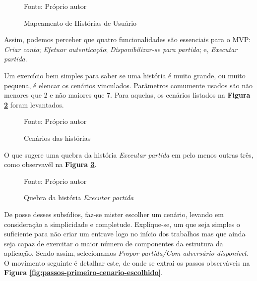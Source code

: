       \begin{figure}[h]
        \centering
        \caption{Mapeamento de Histórias de Usuário}
        Fonte: Próprio autor\footnotemark
        \label{fig:fluxogeral}
      \end{figure}

      Assim, podemos perceber que quatro funcionalidades são essenciais para o
      MVP: \emph{Criar conta}; \emph{Efetuar autenticação};
      \emph{Disponibilizar-se para partida}; e, \emph{Executar partida}.

      Um exercício bem simples para saber se uma história é muito grande, ou
      muito pequena, é elencar os cenários vinculados. Parâmetros comumente
      usados são não menores que 2 e não maiores que 7. Para aquelas, os
      cenários listados na \textbf{Figura \ref{fig:cenarios-das-historias}}
      foram levantados.

      \begin{figure}[h]
        \centering
        \caption{Cenários das histórias}
        
        Fonte: Próprio autor
        \label{fig:cenarios-das-historias}
      \end{figure}

      O que sugere uma quebra da história \emph{Executar partida} em pelo menos
      outras três, como observavél na \textbf{Figura \ref{fig:executar-partida}}.

      \begin{figure}[h]
        \centering
        \caption{Quebra da história \emph{Executar partida}}
        
        Fonte: Próprio autor
        \label{fig:executar-partida}
      \end{figure}

      De posse desses subsídios, faz-se mister escolher um cenário, levando em
      consideração a simplicidade e completude. Explique-se, um que seja simples
      o suficiente para não criar um entrave logo no início dos trabalhos mas
      que ainda seja capaz de exercitar o maior número de componentes da
      estrutura da aplicação. Sendo assim, selecionamos
      \emph{Propor partida/Com adversário disponível}. O movimento seguinte é
      detalhar este, de onde se extrai os passos observáveis na \textbf{Figura
      \ref{fig:passos-primeiro-cenario-escolhido}}.

